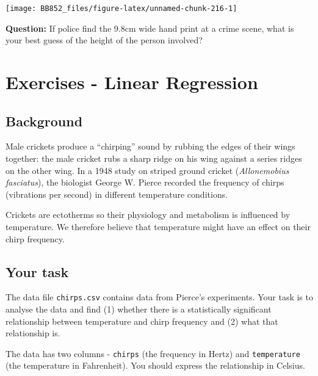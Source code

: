\documentclass[
  a4paperpaper,
]{book}
\begin{document}
\begin{center}\texttt{[image: BB852\_files/figure-latex/unnamed-chunk-216-1]} \end{center}

\textbf{Question:} If police find the 9.8cm wide hand print at a crime scene, what is your best guess of the height of the person involved?

\hypertarget{exercises---linear-regression}{%
\section{Exercises - Linear Regression}\label{exercises---linear-regression}}

\hypertarget{background-1}{%
\subsection{Background}\label{background-1}}

Male crickets produce a ``chirping'' sound by rubbing the edges of their wings together: the male cricket rubs a sharp ridge on his wing against a series ridges on the other wing. In a 1948 study on striped ground cricket (\emph{Allonemobius fasciatus}), the biologist George W. Pierce recorded the frequency of chirps (vibrations per second) in different temperature conditions.

Crickets are ectotherms so their physiology and metabolism is influenced by temperature. We therefore believe that temperature might have an effect on their chirp frequency.

\hypertarget{your-task}{%
\subsection{Your task}\label{your-task}}

The data file \texttt{chirps.csv} contains data from Pierce's experiments. Your task is to analyse the data and find (1) whether there is a statistically significant relationship between temperature and chirp frequency and (2) what that relationship is.

The data has two columns - \texttt{chirps} (the frequency in Hertz) and \texttt{temperature} (the temperature in Fahrenheit). You should express the relationship in Celsius.
\end{document}

